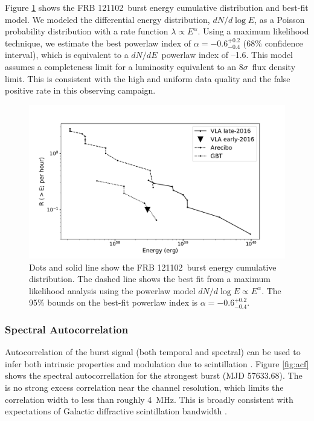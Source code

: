 \documentclass[twocolumn]{aastex61}
\newcommand{\frb}{FRB 121102}
\begin{document}
Figure \ref{fig:ed} shows the \frb\ burst energy cumulative distribution and best-fit model. We modeled the differential energy distribution, $dN/d\log{E}$, as a Poisson probability distribution with a rate function $\lambda\propto E^{\alpha}$. Using a maximum likelihood technique, we estimate the best powerlaw index of $\alpha=-0.6^{+0.2}_{-0.4}$ (68\% confidence interval), which is equivalent to a $dN/dE$\ powerlaw index of --1.6. This model assumes a completeness limit for a luminosity equivalent to an $8\sigma$\ flux density limit. This is consistent with the high and uniform data quality and the false positive rate in this observing campaign.

\begin{figure}[htb]
\begin{center}
\includegraphics[width=0.9\columnwidth]{energy_disn}
\caption{Dots and solid line show the  \frb\ burst energy cumulative distribution. The dashed line shows the best fit from a maximum likelihood analysis using the powerlaw model $dN/d\log{E} \propto E^{\alpha}$. The 95\% bounds on the best-fit powerlaw index is $\alpha=-0.6^{+0.2}_{-0.4}$. \label{fig:ed}}
\end{center}
\end{figure}

\subsubsection{Spectral Autocorrelation}
\label{sec:auto}
Autocorrelation of the burst signal (both temporal and spectral) can be used to infer both intrinsic properties and modulation due to scintillation \citep{CORDES}. Figure \ref{fig:acf} shows the spectral autocorrellation for the strongest burst (MJD 57633.68). The is no strong excess correlation near the channel resolution, which limits the correlation width to less than roughly 4~MHz. This is broadly consistent with expectations of Galactic diffractive scintillation bandwidth \citep[3--9~MHz near 3~GHz][]{2002astro.ph..7156C}.
\end{document}
